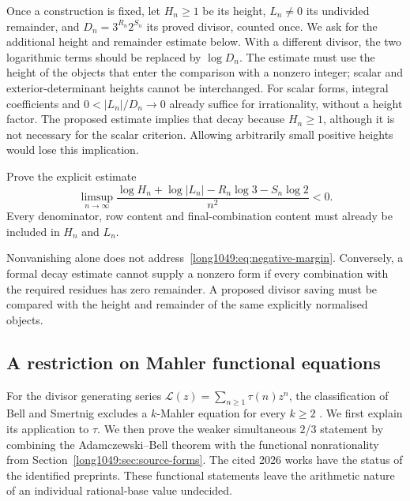 \documentclass[11pt]{article}
\begin{document}
Once a construction is fixed, let $H_n\ge1$ be its height, $L_n\ne0$
its undivided remainder, and $D_n=3^{R_n}2^{S_n}$ its proved divisor,
counted once. We ask for the additional height and remainder estimate
below. With a different divisor, the two logarithmic terms should be
replaced by $\log D_n$. The estimate must use the height of the objects
that enter the comparison with a nonzero integer; scalar and
exterior-determinant heights cannot be interchanged.
For scalar forms, integral coefficients and $0<|L_n|/D_n\to0$
already suffice for irrationality, without a height factor. The
proposed estimate implies that decay because $H_n\ge1$, although it
is not necessary for the scalar criterion. Allowing arbitrarily
small positive heights would lose this implication.

\begin{problem}
Prove the explicit estimate
\begin{equation}
 \limsup_{n\to\infty}
 \frac{\log H_n+\log|L_n|-R_n\log3-S_n\log2}{n^2}<0.
\label{long1049:eq:negative-margin}
\end{equation}
Every denominator, row content and final-combination content must already be
included in $H_n$ and $L_n$.
\end{problem}

Nonvanishing alone does not address~\eqref{long1049:eq:negative-margin}.  Conversely,
a formal decay estimate cannot supply a nonzero form if every
combination with the required residues has zero remainder.  A proposed divisor saving must be compared with the height and remainder
of the same explicitly normalised objects.

\subsection{A restriction on Mahler functional equations}

For the divisor generating series
$\mathcal L(z)=\sum_{n\ge1}\tau(n)z^n$, the classification of Bell and
Smertnig excludes a $k$-Mahler equation for every $k\ge2$
\cite[Thm.~1.3 and the consequences on p.~3]{bellsmertnig2026}.
We first explain its application to $\tau$. We then prove the weaker
simultaneous $2$/$3$ statement by combining the Adamczewski--Bell theorem
with the functional nonrationality from
Section~\ref{long1049:sec:source-forms}.
The cited 2026 works have the status of the identified preprints.
These functional statements leave the arithmetic nature of an
individual rational-base value undecided.
\end{document}
